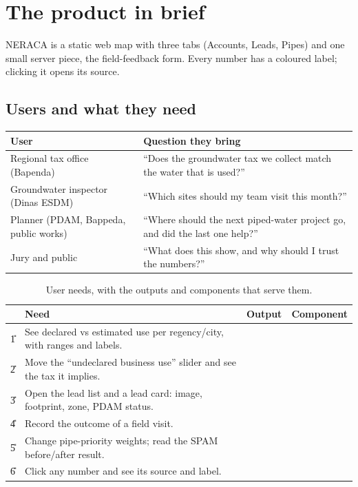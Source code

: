 \section{The product in brief}\label{sec:product}

\begin{inshort}
NERACA is a static web map with three tabs (Accounts, Leads, Pipes) and one small server piece, the
field-feedback form. Every number has a coloured label; clicking it opens its source.
\end{inshort}

\subsection{Users and what they need}

{\small
\begin{xltabular}{\linewidth}{@{}L{40mm}Y@{}}
\toprule
\textbf{User} & \textbf{Question they bring}\\*
\midrule
Regional tax office (Bapenda) & ``Does the groundwater tax we collect match the water that is used?''\\
Groundwater inspector (Dinas ESDM) & ``Which sites should my team visit this month?''\\
Planner (PDAM, Bappeda, public works) & ``Where should the next piped-water project go, and did the last one help?''\\
Jury and public & ``What does this show, and why should I trust the numbers?''\\
\bottomrule
\end{xltabular}}

{\small
\begin{xltabular}{\linewidth}{@{}L{8mm}Y L{16mm}L{21mm}@{}}
\caption{User needs, with the outputs and components that serve them.}\label{tab:needs}\\*
\toprule
 & \textbf{Need} & \textbf{Output} & \textbf{Component}\\*
\midrule
\U{1} & See declared vs estimated use per regency/city, with ranges and labels. &  &  \\
\U{2} & Move the ``undeclared business use'' slider and see the tax it implies. &  & \\
\U{3} & Open the lead list and a lead card: image, footprint, zone, PDAM status. &  &  \\
\U{4} & Record the outcome of a field visit. &  & \\
\U{5} & Change pipe-priority weights; read the SPAM before/after result. &   &  \\
\U{6} & Click any number and see its source and label. &  & \\
\bottomrule
\end{xltabular}}

